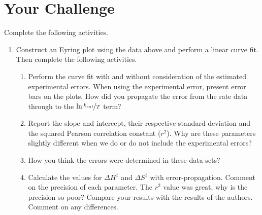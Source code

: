 \documentclass{tufte-handout}
\begin{document}
\clearpage

\section{Your Challenge}

Complete the following activities.

\begin{enumerate}
\item Construct an Eyring plot using the data above and perform a linear curve fit. Then complete the following activities.

\begin{enumerate}
\item Perform the curve fit with and without consideration of the estimated experimental errors. When using the experimental error, present error bars on the plots. How did you propagate the error from the rate data through to the $\ln{\nicefrac{k_{cat}}{T}}$ term?

\item Report the slope and intercept, their respective standard deviation and the squared Pearson correlation constant ($r^2$). Why are these parameters slightly different when we do or do not include the exp\-er\-i\-ment\-al errors?

\item How you think the errors were determined in these data sets?

\item Calculate the values for $\Delta H^\ddagger$ and $\Delta S^\ddagger$ with error-propagation.
Com\-ment on the precision of each parameter. The $r^2$ value was great; why is the precision so poor? Compare your results with the results of the authors. Comment on any differences.


\end{enumerate}
\end{enumerate}
\end{document}

